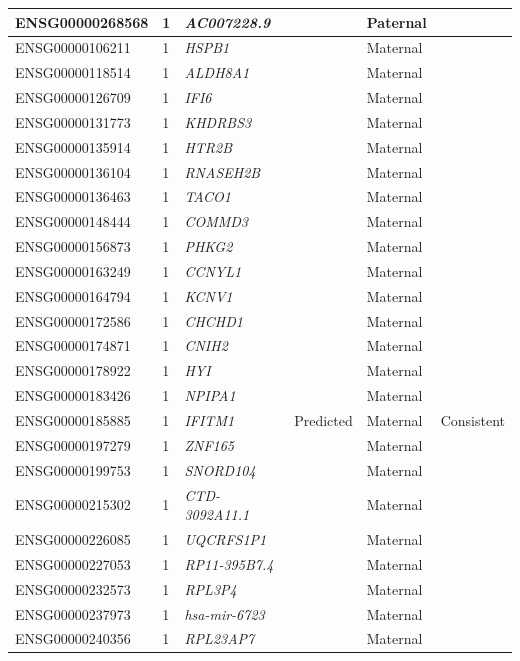 \begin{table}
\begin{adjustbox}{width={\textwidth}}
\begin{tabular}{@{}p{4cm}p{3cm}p{3cm}p{3cm}p{3cm}p{3cm}@{}}
ENSG00000268568 & 1 & \emph{AC007228.9} & & Paternal &   \\ \hline
ENSG00000106211 & 1 & \emph{HSPB1} & & Maternal &   \\ \hline
ENSG00000118514 & 1 & \emph{ALDH8A1} & & Maternal &   \\ \hline
ENSG00000126709 & 1 & \emph{IFI6} & & Maternal &   \\ \hline
ENSG00000131773 & 1 & \emph{KHDRBS3} & & Maternal &   \\ \hline
ENSG00000135914 & 1 & \emph{HTR2B} & & Maternal &   \\ \hline
ENSG00000136104 & 1 & \emph{RNASEH2B} & & Maternal &   \\ \hline
ENSG00000136463 & 1 & \emph{TACO1}& & Maternal &   \\ \hline
ENSG00000148444 & 1 & \emph{COMMD3} & & Maternal &   \\ \hline
ENSG00000156873 & 1 & \emph{PHKG2} & & Maternal &   \\ \hline
ENSG00000163249 & 1 & \emph{CCNYL1} & & Maternal &   \\ \hline
ENSG00000164794 & 1 & \emph{KCNV1} & & Maternal &   \\ \hline
ENSG00000172586 & 1 & \emph{CHCHD1} & & Maternal &   \\ \hline
ENSG00000174871 & 1 & \emph{CNIH2} & & Maternal &   \\ \hline
ENSG00000178922 & 1 & \emph{HYI} & & Maternal &   \\ \hline
ENSG00000183426 & 1 & \emph{NPIPA1} & & Maternal &   \\ \hline
ENSG00000185885 & 1 & \emph{IFITM1} &  Predicted & Maternal & Consistent\\ \hline
ENSG00000197279 & 1 & \emph{ZNF165} & & Maternal &   \\ \hline
ENSG00000199753 & 1 & \emph{SNORD104} & & Maternal &   \\ \hline
ENSG00000215302 & 1 & \emph{CTD-3092A11.1} & & Maternal &   \\ \hline
ENSG00000226085 & 1 & \emph{UQCRFS1P1} & & Maternal &   \\ \hline
ENSG00000227053 & 1 & \emph{RP11-395B7.4} & & Maternal &   \\ \hline
ENSG00000232573 & 1 & \emph{RPL3P4} & & Maternal &   \\ \hline
ENSG00000237973 & 1 & \emph{hsa-mir-6723} & & Maternal &   \\ \hline
ENSG00000240356 & 1 & \emph{RPL23AP7} & & Maternal &   \\ \hline

\end{tabular}
\end{adjustbox}
\end{table}
